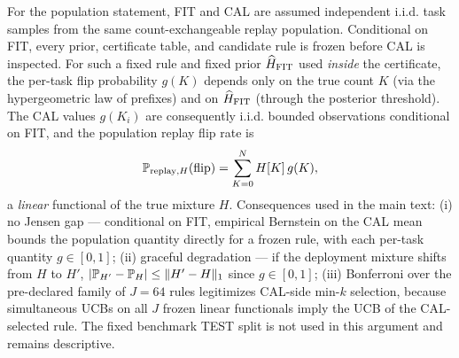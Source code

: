 For the population statement, FIT and CAL are assumed independent i.i.d.
task samples from the same count-exchangeable replay population. Conditional
on FIT, every prior, certificate table, and candidate rule is frozen before
CAL is inspected. For such a fixed rule and fixed prior $\widehat H_{\rm FIT}$
used \emph{inside} the certificate, the per-task flip probability $g(K)$
depends only on the true count $K$ (via the hypergeometric law of prefixes)
and on $\widehat H_{\rm FIT}$ (through the posterior threshold). The CAL
values $g(K_i)$ are consequently i.i.d. bounded observations conditional on
FIT, and the population replay flip rate is
\[
\P_{\text{replay},H}(\flip)=\sum_{K=0}^{N} H[K]\,g(K),
\]
a \emph{linear} functional of the true mixture $H$. Consequences used in the
main text: (i) no Jensen gap --- conditional on FIT, empirical Bernstein on
the CAL mean bounds the population quantity directly for a frozen rule, with
each per-task quantity $g\in[0,1]$; (ii) graceful degradation --- if the deployment mixture
shifts from $H$ to $H'$, $|\P_{H'}-\P_H|\le\|H'-H\|_1$ since
$g\in[0,1]$; (iii) Bonferroni over the pre-declared family of $J=64$ rules
legitimizes CAL-side min-$k$ selection, because simultaneous UCBs on all $J$
frozen linear functionals imply the UCB of the CAL-selected rule. The fixed
benchmark TEST split is not used in this argument and remains descriptive.
